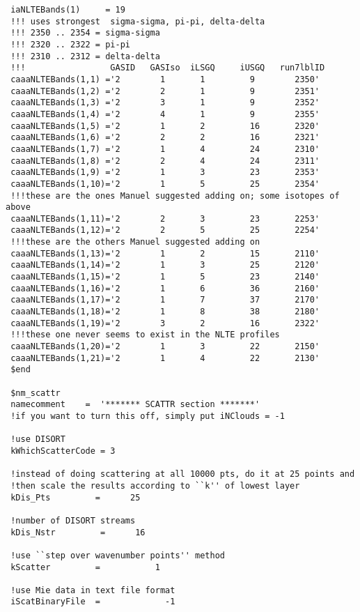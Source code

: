 \documentclass[12pt]{article}
\begin{document}
\begin{scriptsize}
\begin{verbatim}
 iaNLTEBands(1)     = 19
 !!! uses strongest  sigma-sigma, pi-pi, delta-delta 
 !!! 2350 .. 2354 = sigma-sigma 
 !!! 2320 .. 2322 = pi-pi 
 !!! 2310 .. 2312 = delta-delta 
 !!!                 GASID   GASIso  iLSGQ     iUSGQ   run7lblID 
 caaaNLTEBands(1,1) ='2        1       1         9        2350' 
 caaaNLTEBands(1,2) ='2        2       1         9        2351' 
 caaaNLTEBands(1,3) ='2        3       1         9        2352' 
 caaaNLTEBands(1,4) ='2        4       1         9        2355' 
 caaaNLTEBands(1,5) ='2        1       2         16       2320' 
 caaaNLTEBands(1,6) ='2        2       2         16       2321' 
 caaaNLTEBands(1,7) ='2        1       4         24       2310' 
 caaaNLTEBands(1,8) ='2        2       4         24       2311' 
 caaaNLTEBands(1,9) ='2        1       3         23       2353'  
 caaaNLTEBands(1,10)='2        1       5         25       2354'  
 !!!these are the ones Manuel suggested adding on; some isotopes of above
 caaaNLTEBands(1,11)='2        2       3         23       2253'  
 caaaNLTEBands(1,12)='2        2       5         25       2254'  
 !!!these are the others Manuel suggested adding on
 caaaNLTEBands(1,13)='2        1       2         15       2110'  
 caaaNLTEBands(1,14)='2        1       3         25       2120'  
 caaaNLTEBands(1,15)='2        1       5         23       2140'  
 caaaNLTEBands(1,16)='2        1       6         36       2160'  
 caaaNLTEBands(1,17)='2        1       7         37       2170'  
 caaaNLTEBands(1,18)='2        1       8         38       2180'  
 caaaNLTEBands(1,19)='2        3       2         16       2322'
 !!!these one never seems to exist in the NLTE profiles
 caaaNLTEBands(1,20)='2        1       3         22       2150'  
 caaaNLTEBands(1,21)='2        1       4         22       2130'  
 $end

 $nm_scattr
 namecomment    =  '******* SCATTR section *******'
 !if you want to turn this off, simply put iNClouds = -1
 
 !use DISORT
 kWhichScatterCode = 3

 !instead of doing scattering at all 10000 pts, do it at 25 points and
 !then scale the results according to ``k'' of lowest layer
 kDis_Pts         =      25

 !number of DISORT streams
 kDis_Nstr         =      16

 !use ``step over wavenumber points'' method
 kScatter         =           1

 !use Mie data in text file format
 iScatBinaryFile  =             -1


\end{verbatim}
\end{scriptsize}
\end{document}
